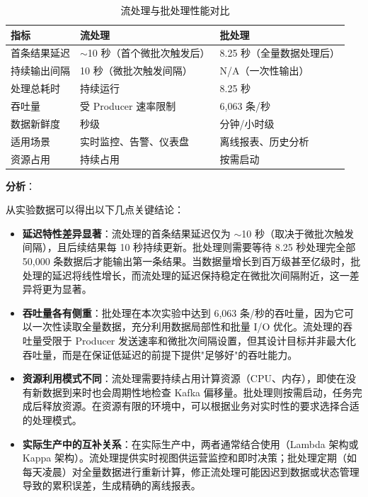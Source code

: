 \documentclass[12pt,a4paper]{article}
\begin{document}
\begin{table}[H]
\centering
\caption{流处理与批处理性能对比}
\label{tab:comparison}
\begin{tabular}{lll}
\toprule
\textbf{指标} & \textbf{流处理} & \textbf{批处理} \\
\midrule
首条结果延迟 & $\sim$10 秒（首个微批次触发后） & 8.25 秒（全量数据处理后） \\
持续输出间隔 & 10 秒（微批次触发间隔） & N/A（一次性输出） \\
处理总耗时 & 持续运行 & 8.25 秒 \\
吞吐量 & 受 Producer 速率限制 & 6,063 条/秒 \\
数据新鲜度 & 秒级 & 分钟/小时级 \\
适用场景 & 实时监控、告警、仪表盘 & 离线报表、历史分析 \\
资源占用 & 持续占用 & 按需启动 \\
\bottomrule
\end{tabular}
\end{table}

\textbf{分析}：

从实验数据可以得出以下几点关键结论：

\begin{itemize}    \item \textbf{延迟特性差异显著}：流处理的首条结果延迟仅为 $\sim$10 秒（取决于微批次触发间隔），且后续结果每 10 秒持续更新。批处理则需要等待 8.25 秒处理完全部 50,000 条数据后才能输出第一条结果。当数据量增长到百万级甚至亿级时，批处理的延迟将线性增长，而流处理的延迟保持稳定在微批次间隔附近，这一差异将更为显著。
    \item \textbf{吞吐量各有侧重}：批处理在本次实验中达到 6,063 条/秒的吞吐量，因为它可以一次性读取全量数据，充分利用数据局部性和批量 I/O 优化。流处理的吞吐量受限于 Producer 发送速率和微批次间隔设置，但其设计目标并非最大化吞吐量，而是在保证低延迟的前提下提供"足够好"的吞吐能力。
    \item \textbf{资源利用模式不同}：流处理需要持续占用计算资源（CPU、内存），即使在没有新数据到来时也会周期性地检查 Kafka 偏移量。批处理则按需启动，任务完成后释放资源。在资源有限的环境中，可以根据业务对实时性的要求选择合适的处理模式。
    \item \textbf{实际生产中的互补关系}：在实际生产中，两者通常结合使用（Lambda 架构或 Kappa 架构）。流处理提供实时视图供运营监控和即时决策；批处理定期（如每天凌晨）对全量数据进行重新计算，修正流处理可能因迟到数据或状态管理导致的累积误差，生成精确的离线报表。
\end{itemize}
\end{document}

